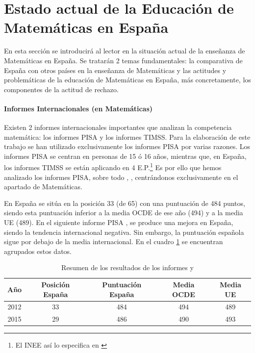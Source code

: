 

\label{chap:intro} %


\section{Estado actual de la Educación de Matemáticas en España}
\label{sec:EstadoEducacionMates}

En esta sección se introducirá al lector en la situación actual de la enseñanza de Matemáticas en España. 
%
Se tratarán 2 temas fundamentales: la comparativa de España con otros países en la enseñanza de Matemáticas y las actitudes y problemáticas de la educación de Matemáticas en España, más concretamente, los componentes de la actitud de rechazo.


\paragraph{Informes Internacionales (en Matemáticas)} 

Existen 2 informes internacionales importantes que analizan la competencia matemática: los informes \gls{PISA} y los informes \gls{TIMSS}. 
%
Para la elaboración de este trabajo se han utilizado exclusivamente los informes \gls{PISA} por varias razones. 
%
Los informes \gls{PISA} se centran en personas de 15 ó 16 años, mientras que, en España, los informes \gls{TIMSS} se están aplicando en 4 E.P.\footnote{El \gls{INEE} así lo especifica en \cite{InformeTimss}} 
%
Es por ello que hemos analizado los informes \gls{PISA}, sobre todo , , centrándonos exclusivamente en el apartado de Matemáticas.

En  España se sitúa en la posición 33 (de 65) con una puntuación de 484 puntos, siendo esta puntuación inferior a la media OCDE de ese año (494) y a la media UE (489).
%
En el siguiente informe PISA , se produce una mejora en España, siendo la tendencia internacional negativa. 
%
Sin embargo, la puntuación española sigue por debajo de la media internacional.
%
En el cuadro \ref{tbl::ResumenPisa} se encuentran agrupados estos datos.

\begin{table}[hbtp]
\centering
\caption{Resumen de los resultados de los informes  y }
\label{tbl::ResumenPisa}
\begin{tabular}{c|cccc}
Año & Posición España & Puntuación España & Media OCDE & Media UE\\\hline
2012 & 33 & 484 & 494 & 489\\
2015 & 29 & 486 & 490 & 493
\end{tabular}
\end{table}

